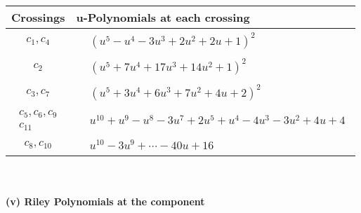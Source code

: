\documentclass[1p]{elsarticle_modified}
\theoremstyle{definition}
\begin{document}
\begin{tabular}{m{50pt}|m{274pt}}
Crossings & \hspace{64pt}u-Polynomials at each crossing \\
\hline $$\begin{aligned}c_{1},c_{4}\end{aligned}$$&$\begin{aligned}
&(u^5- u^4-3 u^3+2 u^2+2 u+1)^2
\end{aligned}$\\
\hline $$\begin{aligned}c_{2}\end{aligned}$$&$\begin{aligned}
&(u^5+7 u^4+17 u^3+14 u^2+1)^2
\end{aligned}$\\
\hline $$\begin{aligned}c_{3},c_{7}\end{aligned}$$&$\begin{aligned}
&(u^5+3 u^4+6 u^3+7 u^2+4 u+2)^2
\end{aligned}$\\
\hline $$\begin{aligned}c_{5},c_{6},c_{9}\\c_{11}\end{aligned}$$&$\begin{aligned}
&u^{10}+u^9- u^8-3 u^7+2 u^5+u^4-4 u^3-3 u^2+4 u+4
\end{aligned}$\\
\hline $$\begin{aligned}c_{8},c_{10}\end{aligned}$$&$\begin{aligned}
&u^{10}-3 u^9+\cdots-40 u+16
\end{aligned}$\\
\hline
\end{tabular}\\~\\
\newpage\renewcommand{\arraystretch}{1}
\flushleft \textbf{(v) Riley Polynomials at the component}\newline \\
\end{document}
